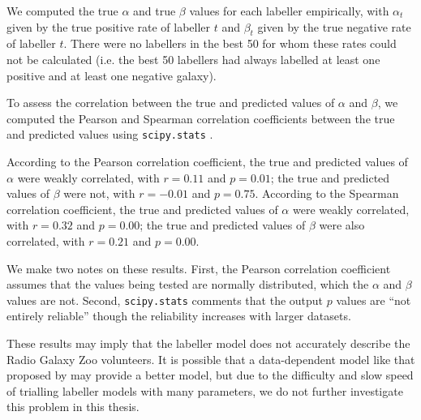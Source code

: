     We computed the true $\alpha$ and true $\beta$ values for each labeller
    empirically, with $\alpha_t$ given by the true positive rate of labeller $t$
    and $\beta_t$ given by the true negative rate of labeller $t$. There were no
    labellers in the best 50 for whom these rates could not be calculated (i.e.
    the best 50 labellers had always labelled at least one positive and at least
    one negative galaxy).

    To assess the correlation between the true and predicted values of $\alpha$
    and $\beta$, we computed the Pearson and Spearman correlation coefficients
    between the true and predicted values using \texttt{scipy.stats}
    \citep{scipy}.

    According to the Pearson correlation coefficient, the true and predicted
    values of $\alpha$ were weakly correlated, with $r = 0.11$ and $p = 0.01$;
    the true and predicted values of $\beta$ were not, with $r = -0.01$ and $p =
    0.75$. According to the Spearman correlation coefficient, the true and
    predicted values of $\alpha$ were weakly correlated, with $r = 0.32$ and $p
    = 0.00$; the true and predicted values of $\beta$ were also correlated, with
    $r = 0.21$ and $p = 0.00$.

    We make two notes on these results. First, the Pearson correlation
    coefficient assumes that the values being tested are normally distributed,
    which the $\alpha$ and $\beta$ values are not. Second, \texttt{scipy.stats}
    comments that the output $p$ values are ``not entirely reliable'' though the
    reliability increases with larger datasets.

    These results may imply that the labeller model does not accurately describe
    the Radio Galaxy Zoo volunteers. It is possible that a data-dependent model
    like that proposed by \citeauthor{yan10} may provide a better model, but due
    to the difficulty and slow speed of trialling labeller models with many
    parameters, we do not further investigate this problem in this thesis.

